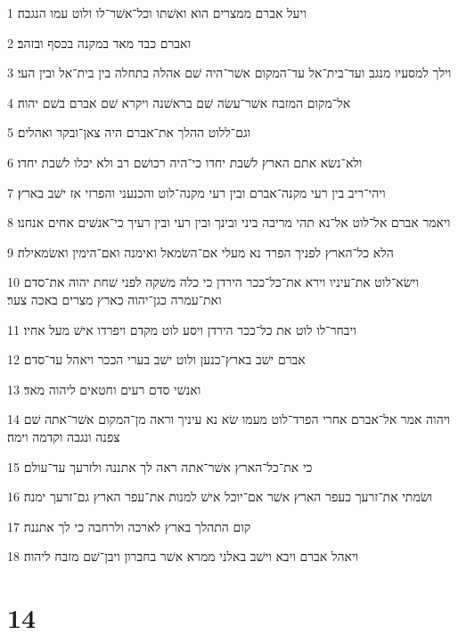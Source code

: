 \par 1 ויעל אברם ממצרים הוא ואשׁתו וכל־אשׁר־לו ולוט עמו הנגבה׃
\par 2 ואברם כבד מאד במקנה בכסף ובזהב׃
\par 3 וילך למסעיו מנגב ועד־בית־אל עד־המקום אשׁר־היה שׁם אהלה בתחלה בין בית־אל ובין העי׃
\par 4 אל־מקום המזבח אשׁר־עשׂה שׁם בראשׁנה ויקרא שׁם אברם בשׁם יהוה׃
\par 5 וגם־ללוט ההלך את־אברם היה צאן־ובקר ואהלים׃
\par 6 ולא־נשׂא אתם הארץ לשׁבת יחדו כי־היה רכושׁם רב ולא יכלו לשׁבת יחדו׃
\par 7 ויהי־ריב בין רעי מקנה־אברם ובין רעי מקנה־לוט והכנעני והפרזי אז ישׁב בארץ׃
\par 8 ויאמר אברם אל־לוט אל־נא תהי מריבה ביני ובינך ובין רעי ובין רעיך כי־אנשׁים אחים אנחנו׃
\par 9 הלא כל־הארץ לפניך הפרד נא מעלי אם־השׂמאל ואימנה ואם־הימין ואשׂמאילה׃
\par 10 וישׂא־לוט את־עיניו וירא את־כל־ככר הירדן כי כלה משׁקה לפני שׁחת יהוה את־סדם ואת־עמרה כגן־יהוה כארץ מצרים באכה צער׃
\par 11 ויבחר־לו לוט את כל־ככר הירדן ויסע לוט מקדם ויפרדו אישׁ מעל אחיו׃
\par 12 אברם ישׁב בארץ־כנען ולוט ישׁב בערי הככר ויאהל עד־סדם׃
\par 13 ואנשׁי סדם רעים וחטאים ליהוה מאד׃
\par 14 ויהוה אמר אל־אברם אחרי הפרד־לוט מעמו שׂא נא עיניך וראה מן־המקום אשׁר־אתה שׁם צפנה ונגבה וקדמה וימה׃
\par 15 כי את־כל־הארץ אשׁר־אתה ראה לך אתננה ולזרעך עד־עולם׃
\par 16 ושׂמתי את־זרעך כעפר הארץ אשׁר אם־יוכל אישׁ למנות את־עפר הארץ גם־זרעך ימנה׃
\par 17 קום התהלך בארץ לארכה ולרחבה כי לך אתננה׃
\par 18 ויאהל אברם ויבא וישׁב באלני ממרא אשׁר בחברון ויבן־שׁם מזבח ליהוה׃

\chapter{14}

